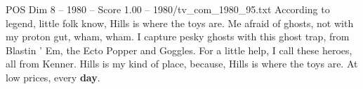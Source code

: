 \begin{textsample}{POS Dim 8 – 1980 – Score 1.00 – 1980/tv\_com\_1980\_95.txt}  \label{ex:f8_pos_045}
According to legend, little folk know, Hills is where the toys are.
Me afraid of ghosts, not with my proton gut, wham, wham.
I capture pesky ghosts with this ghost trap, from Blastin ' Em, the Ecto Popper and Goggles.
For a little help, I call these heroes, all from Kenner.
Hills is my kind of place, because, Hills is where the toys are.
At low prices, every \textbf{day}.

\end{textsample}
